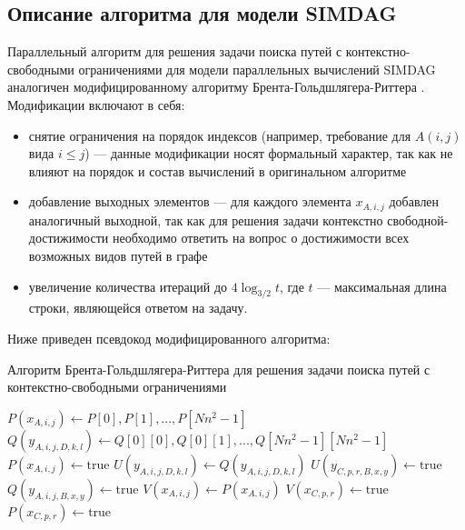 \subsection {Описание алгоритма для модели SIMDAG}
Параллельный алгоритм для решения задачи поиска путей с контекстно-свободными ограничениями для модели параллельных вычислений SIMDAG аналогичен модифицированному алгоритму Брента-Гольдшлягера-Риттера \cite{Brent}. Модификации включают в себя:
\begin{itemize}
  \item снятие ограничения на порядок индексов (например, требование для $A(i, j)$ вида $i \leq j$) --- данные модификации носят формальный характер, так как не влияют на порядок и состав вычислений в оригинальном алгоритме
  \item добавление выходных элементов --- для каждого элемента $x_{A, i, j}$ добавлен аналогичный выходной, так как для решения задачи контекстно свободной-достижимости необходимо ответить на вопрос о достижимости всех возможных видов путей в графе
\item увеличение количества итераций до $4\log_{3/2}t$, где $t$ --- максимальная длина строки, являющейся ответом на задачу.
\end{itemize}
Ниже приведен псевдокод модифицированного алгоритма:
\begin{algorithm}
\caption{Алгоритм Брента-Гольдшлягера-Риттера для решения задачи поиска путей с контекстно-свободными ограничениями}\label{euclid}
\begin{algorithmic}[1]
\State $\textit{$P(x_{A, i, j})$} \gets \textit{$P[0], P[1], ... , P[Nn^2 - 1]$}$
\State $\textit{$Q(y_{A,i,j,D,k,l})$} \gets \textit{$Q[0][0], Q[0][1], ... , Q[Nn^2 - 1] [Nn^2 - 1]$}$
\State $P(x_{A, i, j})  \gets \text{true}$
\EndIf
{}
\State  $\textit{$U(y_{A,i,j,D,k,l})$} \gets \textit{$Q(y_{A,i,j,D,k,l})$}$
\State $U(y_{C,p,r,B,x,y}) \gets \text{true}$
\EndIf
{}
\State $Q(y_{A,i,j,B,x,y}) \gets \text{true}$
\EndIf
\State $V(x_{A, i, j})  \gets P(x_{A, i, j})$
\State $V(x_{C, p, r}) \gets \text{true}$
\EndIf
{}
\State $P(x_{C, p, r}) \gets \text{true}$
\EndIf
 \EndFor
\end{algorithmic}
\end{algorithm}

